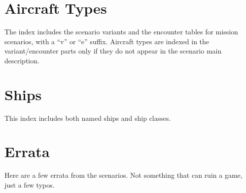 \documentclass[a4paper,twocolumn]{article}
\begin{document}
\section*{Aircraft Types}

The index includes the scenario variants and the encounter
tables for mission scenarios, with a ``v'' or ``e''
suffix. Aircraft types are indexed in the variant/encounter parts only if they do not appear in the
scenario main description.

\vspace{2mm}

\begin{hangparas}{4mm}{1}
\end{hangparas}

\section*{Ships}

This index includes both named ships and ship classes.

\vspace{2mm}

\begin{hangparas}{4mm}{1}
\end{hangparas}

\section*{Errata}

Here are a few errata from the scenarios. Not something that can ruin a game, just
a few typos.

\vspace{3mm}

\begin{hangparas}{4mm}{1}
\end{hangparas}
\end{document}
